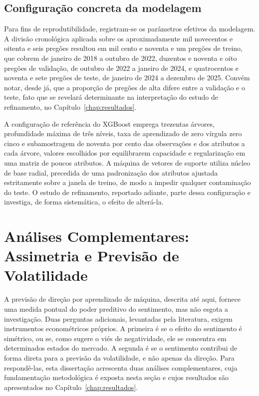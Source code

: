 \subsection{Configuração concreta da modelagem}

Para fins de reprodutibilidade, registram-se os parâmetros efetivos da modelagem. A divisão cronológica aplicada sobre os aproximadamente mil novecentos e oitenta e seis pregões resultou em mil cento e noventa e um pregões de treino, que cobrem de janeiro de 2018 a outubro de 2022, duzentos e noventa e oito pregões de validação, de outubro de 2022 a janeiro de 2024, e quatrocentos e noventa e sete pregões de teste, de janeiro de 2024 a dezembro de 2025. Convém notar, desde já, que a proporção de pregões de alta difere entre a validação e o teste, fato que se revelará determinante na interpretação do estudo de refinamento, no Capítulo~\ref{chap:resultados}.

A configuração de referência do XGBoost emprega trezentas árvores, profundidade máxima de três níveis, taxa de aprendizado de zero vírgula zero cinco e subamostragem de noventa por cento das observações e dos atributos a cada árvore, valores escolhidos por equilibrarem capacidade e regularização em uma matriz de poucos atributos. A máquina de vetores de suporte utiliza núcleo de base radial, precedida de uma padronização dos atributos ajustada estritamente sobre a janela de treino, de modo a impedir qualquer contaminação do teste. O estudo de refinamento, reportado adiante, parte dessa configuração e investiga, de forma sistemática, o efeito de alterá-la.

\section{Análises Complementares: Assimetria e Previsão de Volatilidade}

A previsão de direção por aprendizado de máquina, descrita até aqui, fornece uma medida pontual do poder preditivo do sentimento, mas não esgota a investigação. Duas perguntas adicionais, levantadas pela literatura, exigem instrumentos econométricos próprios. A primeira é se o efeito do sentimento é simétrico, ou se, como sugere o viés de negatividade, ele se concentra em determinados estados do mercado. A segunda é se o sentimento contribui de forma direta para a previsão da volatilidade, e não apenas da direção. Para respondê-las, esta dissertação acrescenta duas análises complementares, cuja fundamentação metodológica é exposta nesta seção e cujos resultados são apresentados no Capítulo~\ref{chap:resultados}.

